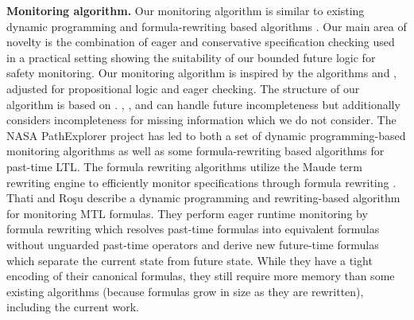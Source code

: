 \vspace*{3pt}
\noindent
\textbf{Monitoring algorithm.}
Our monitoring algorithm is similar to existing dynamic programming and
formula-rewriting based algorithms \cite{Havelund2004,Havelund2002,Rosu2005,Thati2005,Basin2012}.
Our main area of novelty is the combination of eager and conservative specification checking used in a practical setting showing the suitability of our bounded future logic for safety monitoring.
Our monitoring algorithm is inspired by the algorithms \greduce \cite{Garg2011} and
\precis \cite{Chowdhury2014}, adjusted for propositional logic and eager checking.
The structure of our algorithm is based on \greduce.
\greduce, \precis, and \monitor can handle future incompleteness but \greduce additionally
considers incompleteness for missing information which we do not consider.
%
%
The NASA PathExplorer project has led to both a set of dynamic programming-based monitoring algorithms as
well as some formula-rewriting based algorithms \cite{Havelund2004} for past-time LTL.
The formula rewriting algorithms utilize the Maude term rewriting engine to efficiently monitor specifications
through formula rewriting \cite{Rosu2005}.
%
Thati and Ro\c{s}u \cite{Thati2005} describe a dynamic programming and rewriting-based
algorithm for monitoring MTL formulas.
They perform eager runtime monitoring by formula rewriting which resolves past-time formulas
into equivalent formulas without unguarded past-time operators and derive new future-time
formulas which separate the current state from future state.
While they have a tight encoding of their canonical formulas, they still require more memory
than some existing algorithms (because formulas
grow in size as they are rewritten), including the current work.


